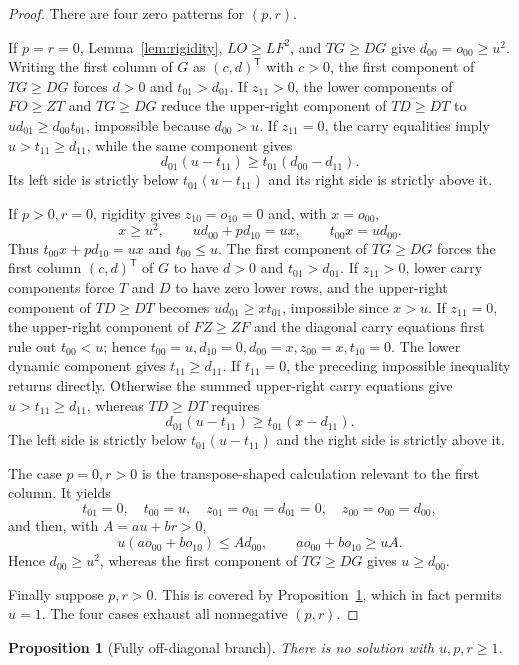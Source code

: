 \documentclass[11pt]{article}
\newtheorem{proposition}[theorem]{Proposition}
\theoremstyle{definition}
\begin{document}
\begin{proof}
There are four zero patterns for $(p,r)$.

If $p=r=0$, Lemma~\ref{lem:rigidity}, $LO\ge LF^2$, and $TG\ge DG$
give $d_{00}=o_{00}\ge u^2$.  Writing the first column of $G$ as
$(c,d)^{\mathsf T}$ with $c>0$, the first component of $TG\ge DG$
forces $d>0$ and $t_{01}>d_{01}$.  If $z_{11}>0$, the lower components of
$FO\ge ZT$ and $TG\ge DG$ reduce the upper-right component of
$TD\ge DT$ to $ud_{01}\ge d_{00}t_{01}$, impossible because
$d_{00}>u$.  If $z_{11}=0$, the carry equalities imply
$u>t_{11}\ge d_{11}$, while the same component gives
\[
 d_{01}(u-t_{11})\ge t_{01}(d_{00}-d_{11}).
\]
Its left side is strictly below $t_{01}(u-t_{11})$ and its right side is
strictly above it.

If $p>0,r=0$, rigidity gives
$z_{10}=o_{10}=0$ and, with $x=o_{00}$,
\[
 x\ge u^2,\qquad ud_{00}+pd_{10}=ux,\qquad
 t_{00}x=ud_{00}.
\]
Thus $t_{00}x+pd_{10}=ux$ and $t_{00}\le u$.  The first component of
$TG\ge DG$ forces the first column $(c,d)^{\mathsf T}$ of $G$ to have
$d>0$ and $t_{01}>d_{01}$.  If $z_{11}>0$, lower carry components force
$T$ and $D$ to have zero lower rows, and the upper-right component of
$TD\ge DT$ becomes $ud_{01}\ge xt_{01}$, impossible since $x>u$.
If $z_{11}=0$, the upper-right component of $FZ\ge ZF$ and the diagonal
carry equations first rule out $t_{00}<u$; hence
$t_{00}=u,d_{10}=0,d_{00}=x,z_{00}=x,t_{10}=0$.  The lower dynamic
component gives $t_{11}\ge d_{11}$.  If $t_{11}=0$, the preceding
impossible inequality returns directly.  Otherwise the summed upper-right
carry equations give $u>t_{11}\ge d_{11}$, whereas $TD\ge DT$ requires
\[
 d_{01}(u-t_{11})\ge t_{01}(x-d_{11}).
\]
The left side is strictly below $t_{01}(u-t_{11})$ and the right side is
strictly above it.

The case $p=0,r>0$ is the transpose-shaped calculation relevant to the first column.  It yields
\[
 t_{01}=0,\quad t_{00}=u,\quad
 z_{01}=o_{01}=d_{01}=0,\quad z_{00}=o_{00}=d_{00},
\]
and then, with $A=au+br>0$,
\[
 u(ao_{00}+bo_{10})\le A d_{00},\qquad
 ao_{00}+bo_{10}\ge uA.
\]
Hence $d_{00}\ge u^2$, whereas the first component of $TG\ge DG$
gives $u\ge d_{00}$.

Finally suppose $p,r>0$.  This is covered by
Proposition~\ref{prop:irreducible}, which in fact permits $u=1$.
The four cases exhaust all nonnegative $(p,r)$.
\end{proof}

\begin{proposition}[Fully off-diagonal branch]\label{prop:irreducible}
There is no solution with $u,p,r\ge1$.
\end{proposition}
\end{document}
